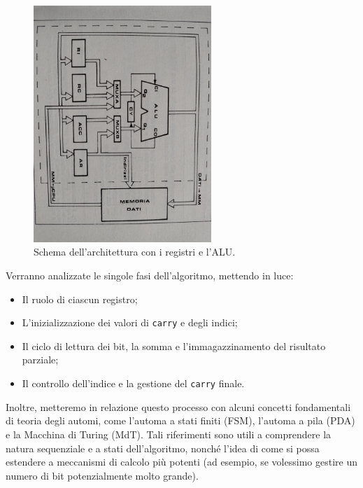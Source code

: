 \documentclass[a4paper,12pt]{report}
\begin{document}
\begin{figure}[ht]
    \centering
    \includegraphics[width=0.6\textwidth]{schema.jpeg}
    \caption{Schema dell'architettura con i registri e l'ALU.}
    \label{fig:schema}
\end{figure}

Verranno analizzate le singole fasi dell'algoritmo, mettendo in luce:
\begin{itemize}
    \item Il ruolo di ciascun registro;
    \item L'inizializzazione dei valori di \texttt{carry} e degli indici;
    \item Il ciclo di lettura dei bit, la somma e l'immagazzinamento del risultato parziale;
    \item Il controllo dell'indice e la gestione del \texttt{carry} finale.
\end{itemize}

Inoltre, metteremo in relazione questo processo con alcuni concetti fondamentali di teoria degli automi, come l'automa a stati finiti (FSM), l'automa a pila (PDA) e la Macchina di Turing (MdT). Tali riferimenti sono utili a comprendere la natura sequenziale e a stati dell'algoritmo, nonché l'idea di come si possa estendere a meccanismi di calcolo più potenti (ad esempio, se volessimo gestire un numero di bit potenzialmente molto grande).
\end{document}
